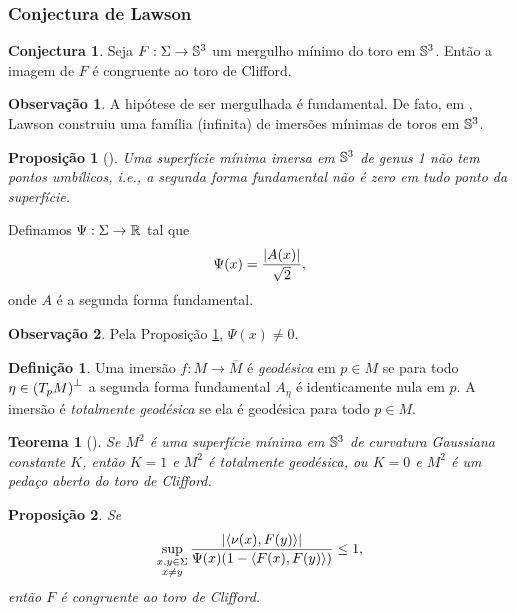 \documentclass[12pt,a4paper]{beamer}
\newtheorem{teorema}{Teorema}
\newtheorem{proposicao}{Proposição}
\theoremstyle{definition}
\newtheorem{definicao}{Definição}
\newtheorem{observacao}{Observação}
\newtheorem{conjectura}{Conjectura}
\begin{document}
\begin{frame}[allowframebreaks]
	\frametitle{Conjectura de Lawson}
	\begin{conjectura}
		Seja $F: \Sigma \rightarrow \mathbb{S}^3$ um mergulho mínimo do toro em $\mathbb{S}^3$. Então a imagem de $F$ é congruente ao toro de Clifford.
	\end{conjectura}

	\begin{observacao}
		A hipótese de ser mergulhada é fundamental. De fato, em \cite{Lawson1969}, Lawson construiu uma família (infinita) de imersões mínimas de toros em $\mathbb{S}^3$. 
	\end{observacao}

	\begin{proposicao}[\cite{Brendle2013}]
		\label{sup-min-nao-tem-pontos-umbilicos}
		Uma superfície mínima imersa em $\mathbb{S}^3$ de genus 1 não tem pontos umbílicos, i.e., a segunda forma fundamental não é zero em tudo ponto da superfície.
	\end{proposicao}

		Definamos $\Psi: \Sigma \rightarrow \mathbb R$ tal que
	\begin{equation*}
	\Psi(x) = \frac{\left| A(x) \right|}{\sqrt{2}},
	\end{equation*}
	onde $A$ é a segunda forma fundamental.
	
	\begin{observacao}
		Pela Proposição \ref{sup-min-nao-tem-pontos-umbilicos}, $\Psi(x) \neq 0$.
	\end{observacao}

	\begin{definicao}
		Uma imersão $f: M \rightarrow \overline{M}$ é \emph{geodésica} em $p \in M$ se para todo $\eta \in \left( T_p M \right)^\perp$ a segunda forma fundamental $A_\eta$ é identicamente nula em $p$. A imersão é \emph{totalmente geodésica} se ela é geodésica para todo $p \in M$.
	\end{definicao}

	\begin{teorema}[\cite{Lawson1969}]
		\label{curv-gauss-de-sup-min-em-S3}
		Se $M^2$ é uma superfície mínima em $\mathbb{S}^3$ de curvatura Gaussiana constante $K$, então $K=1$ e $M^2$ é totalmente geodésica, ou $K=0$ e $M^2$ é um pedaço aberto do toro de Clifford.
	\end{teorema}

	\begin{proposicao}\label{aleph-leq-1}
		Se
		\begin{equation*}
		\sup_{\substack{x,y \in \Sigma \\ x \neq y}} \frac{\left| \left\langle \nu(x),F(y) \right\rangle \right|}{\Psi(x) (1-\left\langle F(x),F(y) \right\rangle)} \leq 1,
		\end{equation*}
		então $F$ é congruente ao toro de Clifford.
	\end{proposicao}


\end{frame}
\end{document}

